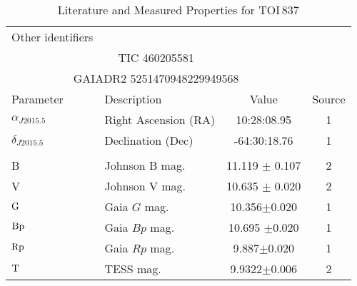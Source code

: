 \begin{table}
\scriptsize
\setlength{\tabcolsep}{2pt}
\centering
\caption{Literature and Measured Properties for TOI$\,$837}
\label{tab:starparams}
\begin{tabular}{llcc}
  \hline
  \hline
Other identifiers\dotfill & \\
\multicolumn{3}{c}{TIC 460205581} \\
\multicolumn{3}{c}{GAIADR2 5251470948229949568} \\
\hline
\hline
Parameter & Description & Value & Source\\
\hline 
$\alpha_{J2015.5}$\dotfill	&Right Ascension (RA)\dotfill & 10:28:08.95 & 1	\\
$\delta_{J2015.5}$\dotfill	&Declination (Dec)\dotfill & -64:30:18.76 & 1	\\
\\
B\dotfill			&Johnson B mag.\dotfill & 11.119 $\pm$ 0.107		& 2	\\
V\dotfill			&Johnson V mag.\dotfill & 10.635 $\pm$ 0.020		& 2	\\
${\rm G}$\dotfill     & Gaia $G$ mag.\dotfill     & 10.356$\pm$0.020 & 1\\
${\rm Bp}$\dotfill     & Gaia $Bp$ mag.\dotfill     & 10.695 $\pm$0.020 & 1\\
${\rm Rp}$\dotfill     & Gaia $Rp$ mag.\dotfill     & 9.887$\pm$0.020 & 1\\
${\rm T}$\dotfill     & TESS mag.\dotfill     & 9.9322$\pm$0.006 & 2\\

\end{tabular}
\end{table}
